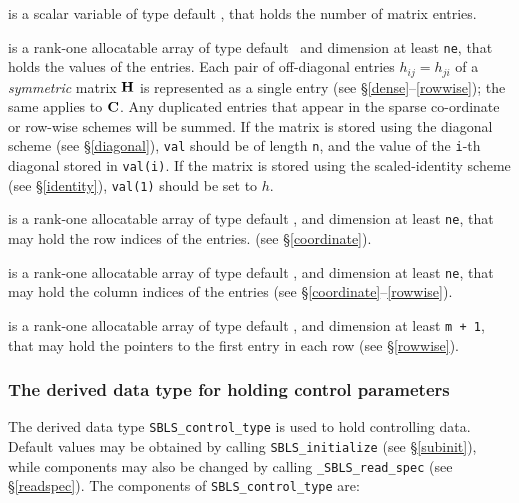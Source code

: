 \documentclass{galahad}
\newcommand{\packagename}{SBLS}
\newcommand{\fullpackagename}{\libraryname\_\packagename}
\begin{document}
\begin{description}
 is a scalar variable of type default \integer, that
holds the number of matrix entries.

 is a rank-one allocatable array of type default \realdp\,
and dimension at least {\tt ne}, that holds the values of the entries.
Each pair of off-diagonal entries $h_{ij} = h_{ji}$ of a {\em symmetric}
matrix ${\mathbf{H}}$ is represented as a single entry
(see \S\ref{dense}--\ref{rowwise}); the same applies to ${\mathbf{C}}$.
Any duplicated entries that appear in the sparse
co-ordinate or row-wise schemes will be summed.
If the matrix is stored using the diagonal scheme (see \S\ref{diagonal}),
{\tt val} should be of length {\tt n}, and the value of the {\tt i}-th
diagonal stored in {\tt val(i)}.
If the matrix is stored using the scaled-identity scheme (see \S\ref{identity}),
{\tt val(1)} should be set to $h$.

 is a rank-one allocatable array of type default \integer,
and dimension at least {\tt ne}, that may hold the row indices of the entries.
(see \S\ref{coordinate}).

 is a rank-one allocatable array of type default \integer,
and dimension at least {\tt ne}, that may hold the column indices of the entries
(see \S\ref{coordinate}--\ref{rowwise}).

 is a rank-one allocatable array of type default \integer,
and dimension at least {\tt m + 1}, that may hold the pointers to
the first entry in each row (see \S\ref{rowwise}).

\end{description}



\subsubsection{The derived data type for holding control
 parameters}\label{typecontrol}
The derived data type
{\tt \packagename\_control\_type}
is used to hold controlling data. Default values may be obtained by calling
{\tt \packagename\_initialize}
(see \S\ref{subinit}),
while components may also be changed by calling
{\tt \fullpackagename\_read\-\_spec}
(see \S\ref{readspec}).
The components of
{\tt \packagename\_control\_type}
are:
\end{document}
